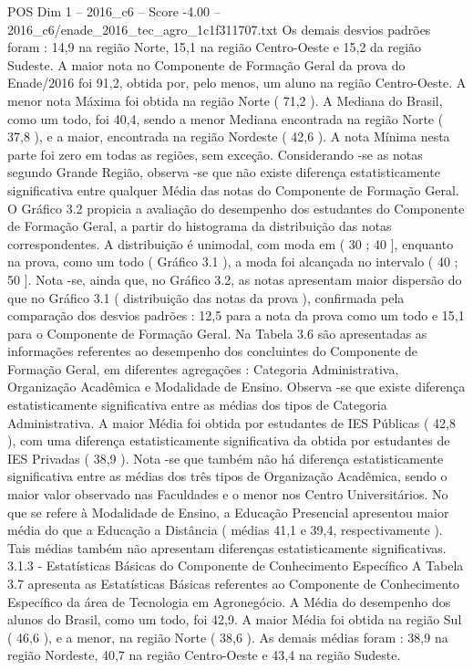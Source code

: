 \begin{textsample}{POS Dim 1 – 2016\_c6 – Score -4.00 – 2016\_c6/enade\_2016\_tec\_agro\_1c1f311707.txt}
Os demais desvios padrões foram : 14,9 na região Norte, 15,1 na região Centro-Oeste e 15,2 da região Sudeste.
A maior nota no Componente de Formação Geral da prova do Enade/2016 foi 91,2, obtida por, pelo menos, um aluno na região Centro-Oeste.
A menor nota Máxima foi obtida na região Norte ( 71,2 ).
A Mediana do Brasil, como um todo, foi 40,4, sendo a menor Mediana encontrada na região Norte ( 37,8 ), e a maior, encontrada na região Nordeste ( 42,6 ).
A nota Mínima nesta parte foi zero em todas as regiões, sem exceção.
Considerando -se as notas segundo Grande Região, observa -se que não existe diferença estatisticamente significativa entre qualquer Média das notas do Componente de Formação Geral.
O Gráfico 3.2 propicia a avaliação do desempenho dos estudantes do Componente de Formação Geral, a partir do histograma da distribuição das notas correspondentes.
A distribuição é unimodal, com moda em ( 30 ; 40 ], enquanto na prova, como um todo ( Gráfico 3.1 ), a moda foi alcançada no intervalo ( 40 ; 50 ].
Nota -se, ainda que, no Gráfico 3.2, as notas apresentam maior dispersão do que no Gráfico 3.1 ( distribuição das notas da prova ), confirmada pela comparação dos desvios padrões : 12,5 para a nota da prova como um todo e 15,1 para o Componente de Formação Geral.
Na Tabela 3.6 são apresentadas as informações referentes ao desempenho dos concluintes do Componente de Formação Geral, em diferentes agregações : Categoria Administrativa, Organização Acadêmica e Modalidade de Ensino.
Observa -se que existe diferença estatisticamente significativa entre as médias dos tipos de Categoria Administrativa.
A maior Média foi obtida por estudantes de IES Públicas ( 42,8 ), com uma diferença estatisticamente significativa da obtida por estudantes de IES Privadas ( 38,9 ).
Nota -se que também não há diferença estatisticamente significativa entre as médias dos três tipos de Organização Acadêmica, sendo o maior valor observado nas Faculdades e o menor nos Centro Universitários.
No que se refere à Modalidade de Ensino, a Educação Presencial apresentou maior média do que a Educação a Distância ( médias 41,1 e 39,4, respectivamente ).
Tais médias também não apresentam diferenças estatisticamente significativas. 3.1.3 - Estatísticas Básicas do Componente de Conhecimento Específico A Tabela 3.7 apresenta as Estatísticas Básicas referentes ao Componente de Conhecimento Específico da área de Tecnologia em Agronegócio.
A Média do desempenho dos alunos do Brasil, como um todo, foi 42,9.
A maior Média foi obtida na região Sul ( 46,6 ), e a menor, na região Norte ( 38,6 ).
As demais médias foram : 38,9 na região Nordeste, 40,7 na região Centro-Oeste e 43,4 na região Sudeste.

\end{textsample}
